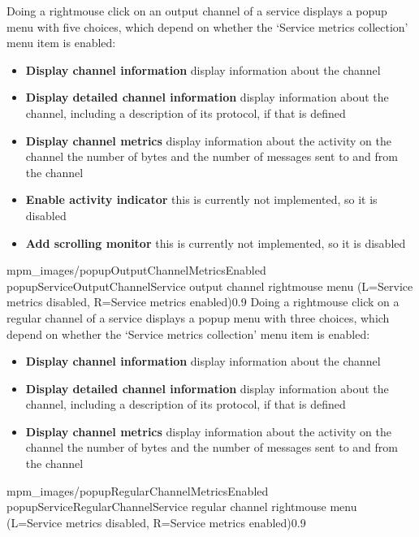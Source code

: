 Doing a right\longDash{}mouse click on an output channel of a service displays a popup
menu with five choices, which depend on whether the `Service metrics collection' menu
item is enabled:
\begin{itemize}
\item\textbf{Display channel information} display information about the channel
\item\exSp\textbf{Display detailed channel information} display information about the
channel, including a description of its protocol, if that is defined
\item\exSp\textbf{Display channel metrics} display information about the activity on the
channel \longDash{} the number of bytes and the number of messages sent to and from the
channel
\item\exSp\textbf{Enable activity indicator} \longDash{} this is currently not
implemented, so it is disabled
\item\exSp\textbf{Add scrolling monitor} \longDash{} this is currently not implemented, so
it is disabled
\end{itemize}
%
{mpm_images/popupOutputChannelMetricsEnabled}%
{popupServiceOutputChannel}{Service output channel right\longDash{}mouse menu
(L=Service metrics disabled, R=Service metrics enabled)}{0.9}
\condPage{}
Doing a right\longDash{}mouse click on a regular channel of a service displays a popup
menu with three choices, which depend on whether the `Service metrics collection' menu
item is enabled:
\begin{itemize}
\item\textbf{Display channel information} display information about the channel
\item\exSp\textbf{Display detailed channel information} display information about the
channel, including a description of its protocol, if that is defined
\item\exSp\textbf{Display channel metrics} display information about the activity on the
channel \longDash{} the number of bytes and the number of messages sent to and from the
channel
\end{itemize}
%
{mpm_images/popupRegularChannelMetricsEnabled}%
{popupServiceRegularChannel}{Service regular channel right\longDash{}mouse menu
(L=Service metrics disabled, R=Service metrics enabled)}{0.9}

